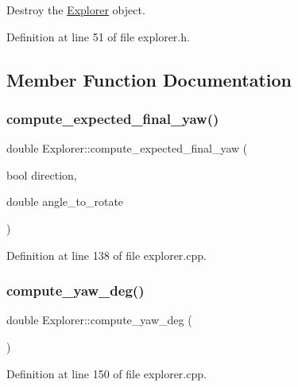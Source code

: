 Destroy the \hyperlink{class_explorer}{Explorer} object. 



Definition at line 51 of file explorer.\+h.



\subsection{Member Function Documentation}
\mbox{\label{class_explorer_a02c37b93448ed474f1bf0d03e2758ca2}} 
\subsubsection{\texorpdfstring{compute\+\_\+expected\+\_\+final\+\_\+yaw()}{compute\_expected\_final\_yaw()}}
{\footnotesize\ttfamily double Explorer\+::compute\+\_\+expected\+\_\+final\+\_\+yaw (\begin{DoxyParamCaption}\item[{bool}]{direction,  }\item[{double}]{angle\+\_\+to\+\_\+rotate }\end{DoxyParamCaption})}



Definition at line 138 of file explorer.\+cpp.

\mbox{\label{class_explorer_a670cdffdb8c3173c300590cfc45ab6d2}} 
\subsubsection{\texorpdfstring{compute\+\_\+yaw\+\_\+deg()}{compute\_yaw\_deg()}}
{\footnotesize\ttfamily double Explorer\+::compute\+\_\+yaw\+\_\+deg (\begin{DoxyParamCaption}{ }\end{DoxyParamCaption})}



Definition at line 150 of file explorer.\+cpp.

\mbox{\label{class_explorer_ac5b91cd64189a60ffe62535cb5bc093a}} 
